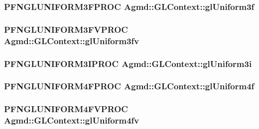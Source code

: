 \hypertarget{class_agmd_1_1_g_l_context_a2750234474738f10b61b40f56604d9ad}{
\subsubsection[{gl\+Uniform3f}]{\setlength{\rightskip}{0pt plus 5cm}P\+F\+N\+G\+L\+U\+N\+I\+F\+O\+R\+M3\+F\+P\+R\+O\+C Agmd\+::\+G\+L\+Context\+::gl\+Uniform3f}}\label{class_agmd_1_1_g_l_context_a2750234474738f10b61b40f56604d9ad}
\hypertarget{class_agmd_1_1_g_l_context_a507d522bcec3dec2081d063ce4b46e36}{
\subsubsection[{gl\+Uniform3fv}]{\setlength{\rightskip}{0pt plus 5cm}P\+F\+N\+G\+L\+U\+N\+I\+F\+O\+R\+M3\+F\+V\+P\+R\+O\+C Agmd\+::\+G\+L\+Context\+::gl\+Uniform3fv}}\label{class_agmd_1_1_g_l_context_a507d522bcec3dec2081d063ce4b46e36}
\hypertarget{class_agmd_1_1_g_l_context_a80174807b8c02c8c21bb683fff46fddb}{
\subsubsection[{gl\+Uniform3i}]{\setlength{\rightskip}{0pt plus 5cm}P\+F\+N\+G\+L\+U\+N\+I\+F\+O\+R\+M3\+I\+P\+R\+O\+C Agmd\+::\+G\+L\+Context\+::gl\+Uniform3i}}\label{class_agmd_1_1_g_l_context_a80174807b8c02c8c21bb683fff46fddb}
\hypertarget{class_agmd_1_1_g_l_context_a1d1f3fceb209c0bfadde246fda5288e4}{
\subsubsection[{gl\+Uniform4f}]{\setlength{\rightskip}{0pt plus 5cm}P\+F\+N\+G\+L\+U\+N\+I\+F\+O\+R\+M4\+F\+P\+R\+O\+C Agmd\+::\+G\+L\+Context\+::gl\+Uniform4f}}\label{class_agmd_1_1_g_l_context_a1d1f3fceb209c0bfadde246fda5288e4}
\hypertarget{class_agmd_1_1_g_l_context_ad4fa44817968f90c05298b2769f85b16}{
\subsubsection[{gl\+Uniform4fv}]{\setlength{\rightskip}{0pt plus 5cm}P\+F\+N\+G\+L\+U\+N\+I\+F\+O\+R\+M4\+F\+V\+P\+R\+O\+C Agmd\+::\+G\+L\+Context\+::gl\+Uniform4fv}}\label{class_agmd_1_1_g_l_context_ad4fa44817968f90c05298b2769f85b16}
